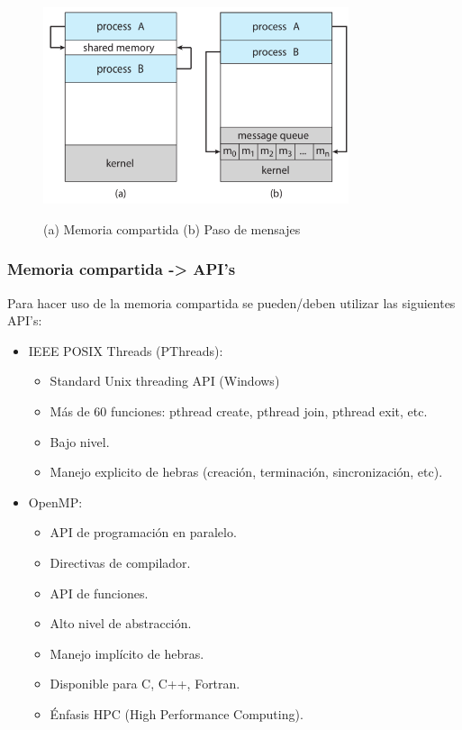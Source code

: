 \documentclass{templateNote}
\begin{document}
\begin{figure}[H]
    \centering
    \includegraphics[width=0.8\textwidth]{img/ipc.png}

    (a) Memoria compartida \hspace{1.5cm} (b) Paso de mensajes
\end{figure}

\subsubsection*{Memoria compartida -> API's}

Para hacer uso de la memoria compartida se pueden/deben utilizar las siguientes API's:
\begin{itemize}
    \item IEEE POSIX Threads (PThreads):
    \begin{itemize}
        \item Standard Unix threading API (Windows)
        \item Más de 60 funciones: pthread create, pthread join, pthread exit, etc.
        \item Bajo nivel.
        \item Manejo explicito de hebras (creación, terminación, sincronización, etc).
    \end{itemize}
    \item OpenMP:
    \begin{itemize}
        \item API de programación en paralelo.
        \item Directivas de compilador.
        \item API de funciones.
        \item Alto nivel de abstracción.
        \item Manejo implícito de hebras.
        \item Disponible para C, C++, Fortran.
        \item Énfasis HPC (High Performance Computing).
    \end{itemize}
\end{itemize}
\end{document}

